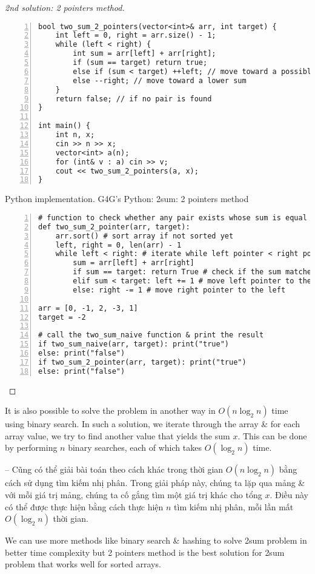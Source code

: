 \documentclass{article}
\begin{document}
\begin{proof}[2nd solution: 2 pointers method]
\begin{enumerate}
\begin{Verbatim}[numbers=left,xleftmargin=5mm]
bool two_sum_2_pointers(vector<int>& arr, int target) {
    int left = 0, right = arr.size() - 1;
    while (left < right) {
        int sum = arr[left] + arr[right];
        if (sum == target) return true;
        else if (sum < target) ++left; // move toward a possibly higher sum
        else --right; // move toward a lower sum
    }
    return false; // if no pair is found
}

int main() {
    int n, x;
    cin >> n >> x;
    vector<int> a(n);
    for (int& v : a) cin >> v;
    cout << two_sum_2_pointers(a, x);
}
        \end{Verbatim}
    \end{enumerate}
    \item {\sf Python implementation.} G4G's Python: 2sum: 2 pointers method
    \begin{Verbatim}[numbers=left,xleftmargin=5mm]
# function to check whether any pair exists whose sum is equal to the given target value
def two_sum_2_pointer(arr, target):
    arr.sort() # sort array if not sorted yet
    left, right = 0, len(arr) - 1
    while left < right: # iterate while left pointer < right pointer
        sum = arr[left] + arr[right]
        if sum == target: return True # check if the sum matches the target
        elif sum < target: left += 1 # move left pointer to the right
        else: right -= 1 # move right pointer to the left

arr = [0, -1, 2, -3, 1]
target = -2

# call the two_sum_naive function & print the result
if two_sum_naive(arr, target): print("true")
else: print("false")
if two_sum_2_pointer(arr, target): print("true")
else: print("false")
    \end{Verbatim}
\end{proof}
It is also possible to solve the problem in another way in $O(n\log_2n)$ time using binary search. In such a solution, we iterate through the array \& for each array value, we try to find another value that yields the sum $x$. This can be done by performing $n$ binary searches, each of which takes $O(\log_2n)$ time.

-- Cũng có thể giải bài toán theo cách khác trong thời gian $O(n\log_2n)$ bằng cách sử dụng tìm kiếm nhị phân. Trong giải pháp này, chúng ta lặp qua mảng \& với mỗi giá trị mảng, chúng ta cố gắng tìm một giá trị khác cho tổng $x$. Điều này có thể được thực hiện bằng cách thực hiện $n$ tìm kiếm nhị phân, mỗi lần mất $O(\log_2n)$ thời gian.

We can use more methods like binary search \& hashing to solve {\sc2sum} problem in better time complexity but 2 pointers method is the best solution for {\sc2sum} problem that works well for sorted arrays.
\end{document}
